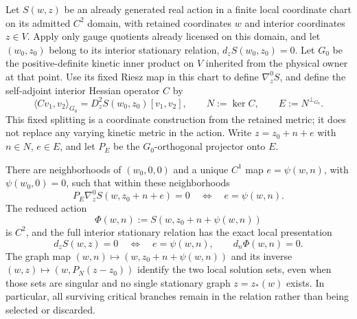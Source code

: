 \documentclass[12pt,a4paper]{article}
\begin{document}
\begin{theorem}
\label{p2a:thm:v3110-finite-critical-stationary-relation}
Let $S(w,z)$ be an already generated real action in a finite local coordinate
chart on its admitted $C^2$ domain, with retained coordinates $w$ and interior
coordinates $z\in V$.  Apply only gauge quotients already licensed on this
domain, and let $(w_0,z_0)$ belong to its interior stationary relation,
$d_zS(w_0,z_0)=0$.  Let $G_0$ be the positive-definite kinetic inner product
on $V$ inherited from the physical owner at that point.  Use its fixed Riesz
map in this chart to define $\nabla_z^0S$, and define the self-adjoint
interior Hessian operator $C$ by
\[
 \langle Cv_1,v_2\rangle_{G_0}
 =D_z^2S(w_0,z_0)[v_1,v_2],\qquad
 N:=\ker C,\qquad E:=N^{\perp_{G_0}}.
\]
This fixed splitting is a coordinate construction from the retained metric;
it does not replace any varying kinetic metric in the action.  Write
$z=z_0+n+e$ with $n\in N$, $e\in E$, and let $P_E$ be the
$G_0$-orthogonal projector onto $E$.

There are neighborhoods of $(w_0,0,0)$ and a unique $C^1$ map
$e=\psi(w,n)$, with $\psi(w_0,0)=0$, such that within these neighborhoods
\[
 P_E\nabla_z^0S(w,z_0+n+e)=0
 \quad\Longleftrightarrow\quad e=\psi(w,n).
\]
The reduced action
\[
 \Phi(w,n):=S(w,z_0+n+\psi(w,n))
\]
is $C^2$, and the full interior stationary relation has the exact local
presentation
\begin{equation}
\label{p2a:eq:v3110-critical-stationary-relation}
 \boxed{
 d_zS(w,z)=0
 \quad\Longleftrightarrow\quad
 e=\psi(w,n),\qquad d_n\Phi(w,n)=0.}
\end{equation}
The graph map $(w,n)\mapsto(w,z_0+n+\psi(w,n))$ and its inverse
$(w,z)\mapsto(w,P_N(z-z_0))$ identify the two local solution sets, even
when those sets are singular and no single stationary graph $z=z_*(w)$
exists.  In particular, all surviving critical branches remain in the
relation rather than being selected or discarded.
\end{theorem}
\end{document}
